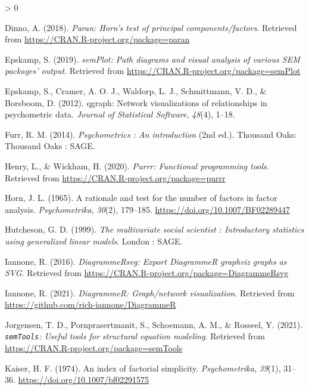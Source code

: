 \documentclass[
  english,
  man]{apa6}
\newlength{\cslhangindent}
\newenvironment{CSLReferences}[2] %
 {%
  \setlength{\parindent}{0pt}
  \ifodd #1 \everypar{\setlength{\hangindent}{\cslhangindent}}\ignorespaces\fi
  \ifnum #2 > 0
  \setlength{\parskip}{#2\baselineskip}
  \fi
 }%
 {}
\begin{document}
\begin{CSLReferences}{1}{0}
\leavevmode\hypertarget{ref-R-paran}{}%
Dinno, A. (2018). \emph{Paran: Horn's test of principal components/factors}. Retrieved from \url{https://CRAN.R-project.org/package=paran}

\leavevmode\hypertarget{ref-R-semPlot}{}%
Epskamp, S. (2019). \emph{semPlot: Path diagrams and visual analysis of various SEM packages' output}. Retrieved from \url{https://CRAN.R-project.org/package=semPlot}

\leavevmode\hypertarget{ref-R-qgraph}{}%
Epskamp, S., Cramer, A. O. J., Waldorp, L. J., Schmittmann, V. D., \& Borsboom, D. (2012). {qgraph}: Network visualizations of relationships in psychometric data. \emph{Journal of Statistical Software}, \emph{48}(4), 1--18.

\leavevmode\hypertarget{ref-furrPsychometricsIntroduction2014}{}%
Furr, R. M. (2014). \emph{Psychometrics : An introduction} (2nd ed.). {Thousand Oaks}: {Thousand Oaks : SAGE}.

\leavevmode\hypertarget{ref-R-purrr}{}%
Henry, L., \& Wickham, H. (2020). \emph{Purrr: Functional programming tools}. Retrieved from \url{https://CRAN.R-project.org/package=purrr}

\leavevmode\hypertarget{ref-hornRationaleTestNumber1965}{}%
Horn, J. L. (1965). A rationale and test for the number of factors in factor analysis. \emph{Psychometrika}, \emph{30}(2), 179--185. \url{https://doi.org/10.1007/BF02289447}

\leavevmode\hypertarget{ref-hutchesonMultivariateSocialScientist1999}{}%
Hutcheson, G. D. (1999). \emph{The multivariate social scientist : Introductory statistics using generalized linear models}. {London : SAGE}.

\leavevmode\hypertarget{ref-R-DiagrammeRsvg}{}%
Iannone, R. (2016). \emph{DiagrammeRsvg: Export DiagrammeR graphviz graphs as SVG}. Retrieved from \url{https://CRAN.R-project.org/package=DiagrammeRsvg}

\leavevmode\hypertarget{ref-R-DiagrammeR}{}%
Iannone, R. (2021). \emph{DiagrammeR: Graph/network visualization}. Retrieved from \url{https://github.com/rich-iannone/DiagrammeR}

\leavevmode\hypertarget{ref-R-semTools}{}%
Jorgensen, T. D., Pornprasertmanit, S., Schoemann, A. M., \& Rosseel, Y. (2021). \emph{\texttt{semTools}: {U}seful tools for structural equation modeling}. Retrieved from \url{https://CRAN.R-project.org/package=semTools}

\leavevmode\hypertarget{ref-kaiserIndexFactorialSimplicity1974}{}%
Kaiser, H. F. (1974). An index of factorial simplicity. \emph{Psychometrika}, \emph{39}(1), 31--36. \url{https://doi.org/10.1007/bf02291575}


\end{CSLReferences}
\end{document}

